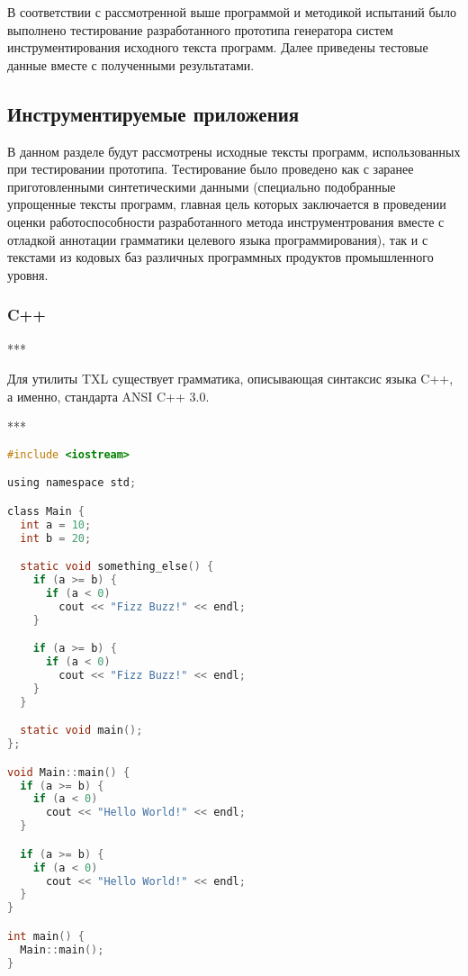 В соответствии с рассмотренной выше программой и методикой испытаний было выполнено тестирование разработанного прототипа генератора систем инструментирования исходного текста программ.
Далее приведены тестовые данные вместе с полученными результатами.

\subsection{Инструментируемые приложения}

В данном разделе будут рассмотрены исходные тексты программ, использованных при тестировании прототипа.
Тестирование было проведено как с заранее приготовленными синтетическими данными (специально подобранные упрощенные тексты программ, главная цель которых заключается в проведении оценки работоспособности разработанного метода инструментрования вместе с отладкой аннотации грамматики целевого языка программирования), так и с текстами из кодовых баз различных программных продуктов промышленного уровня.

\subsubsection{C++}

***

Для утилиты TXL существует грамматика, описывающая синтаксис языка C++, а именно, стандарта ANSI C++ 3.0.

***

\begin{lstlisting}[frame=single, language=C, label={test-c}, caption={Исходный текст тестового приложения}]
#include <iostream>

using namespace std;

class Main {
  int a = 10;
  int b = 20;

  static void something_else() {
    if (a >= b) {
      if (a < 0)
        cout << "Fizz Buzz!" << endl;
    }

    if (a >= b) {
      if (a < 0)
        cout << "Fizz Buzz!" << endl;
    }
  }

  static void main();
};

void Main::main() {
  if (a >= b) {
    if (a < 0)
      cout << "Hello World!" << endl;
  }

  if (a >= b) {
    if (a < 0)
      cout << "Hello World!" << endl;
  }
}

int main() {
  Main::main();
}
\end{lstlisting}

